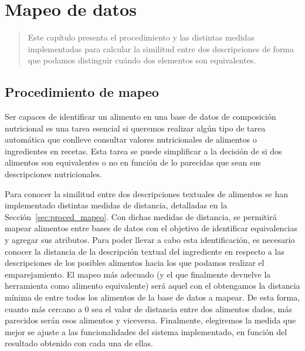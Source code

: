 \chapter{Mapeo de datos}

\label{ch:Capitulo 6}

\begin{quote}
  Este capítulo presenta el procedimiento y las distintas medidas implementadas para calcular la similitud entre dos descripciones de forma que podamos distinguir cuándo dos elementos son equivalentes.
\end{quote}


\section{Procedimiento de mapeo}

Ser capaces de identificar un alimento en una base de datos de composición nutricional es una tarea esencial si queremos realizar algún tipo de tarea automática que conlleve consultar valores nutricionales de alimentos o ingredientes en recetas. Esta tarea se puede simplificar a la decisión de si dos alimentos son equivalentes o no en función de lo parecidas que sean sus descripciones nutricionales.

Para conocer la similitud entre dos descripciones textuales de alimentos se han implementado distintas medidas de distancia, detalladas en la Sección~\ref{sec:proced_mapeo}. Con dichas medidas de distancia, se permitirá mapear alimentos entre bases de datos con el objetivo de identificar equivalencias y agregar sus atributos. Para poder llevar a cabo esta identificación, es necesario conocer la distancia de la descripción textual del ingrediente en respecto a las descripciones de los posibles alimentos hacia los que podamos realizar el emparejamiento. El mapeo más adecuado (y el que finalmente devuelve la herramienta como alimento equivalente) será aquel con el obtengamos la distancia mínima de entre todos los alimentos de la base de datos a mapear. De esta forma, cuanto más cercano a 0 sea el valor de distancia entre dos alimentos dados, más parecidos serán esos alimentos y viceversa. Finalmente, elegiremos la medida que mejor se ajuste a las funcionalidades del sistema implementado, en función del resultado obtenido con cada una de ellas.

